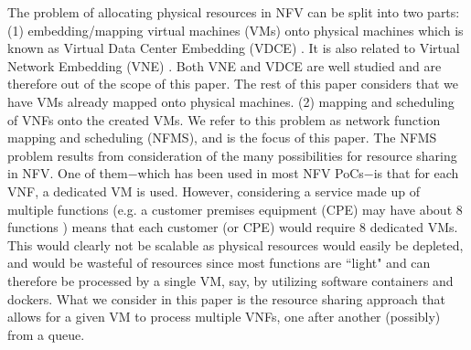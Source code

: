 \documentclass[conference]{IEEEtran}
\begin{document}
The problem of allocating physical resources in NFV can be split into two parts: (1) embedding/mapping virtual machines (VMs) onto physical machines which is known as Virtual Data Center Embedding (VDCE) \cite{Rabbani13}. It is also related to Virtual Network Embedding (VNE) \cite{RashidDissertation, rl, neurofuzzy}. Both VNE and VDCE are well studied and are therefore out of the scope of this paper. The rest of this paper considers that we have \acp{VM} already mapped onto physical machines. (2) mapping and scheduling of VNFs onto the created \acp{VM}. We refer to this problem as network function mapping and scheduling (NFMS), and is the focus of this paper. The NFMS problem results from consideration of the many possibilities for resource sharing in \ac{NFV}. One of them$-$which has been used in most NFV PoCs$-$is that for each VNF, a dedicated VM is used. However, considering a service made up of multiple functions (e.g. a customer premises equipment (CPE) may have about 8 functions \cite{MijumbiNFV15}) means that each customer (or CPE) would require 8 dedicated VMs. This would clearly not be scalable as physical resources would easily be depleted, and would be wasteful of resources since most functions are ``light" and can therefore be processed by a single VM, say, by utilizing software containers and dockers. What we consider in this paper is the resource sharing approach that allows for a given VM to process multiple VNFs, one after another (possibly) from a queue.\\
\end{document}
